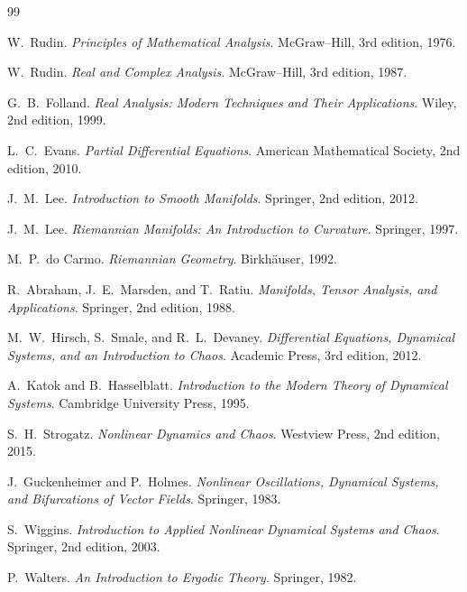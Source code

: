 \documentclass[12pt]{book}
\begin{document}
\newpage
\begin{thebibliography}{99}


W.~Rudin.
\textit{Principles of Mathematical Analysis}.
McGraw--Hill, 3rd edition, 1976.

W.~Rudin.
\textit{Real and Complex Analysis}.
McGraw--Hill, 3rd edition, 1987.

G.~B.~Folland.
\textit{Real Analysis: Modern Techniques and Their Applications}.
Wiley, 2nd edition, 1999.

L.~C.~Evans.
\textit{Partial Differential Equations}.
American Mathematical Society, 2nd edition, 2010.


J.~M.~Lee.
\textit{Introduction to Smooth Manifolds}.
Springer, 2nd edition, 2012.

J.~M.~Lee.
\textit{Riemannian Manifolds: An Introduction to Curvature}.
Springer, 1997.

M.~P.~do Carmo.
\textit{Riemannian Geometry}.
Birkhäuser, 1992.

R.~Abraham, J.~E.~Marsden, and T.~Ratiu.
\textit{Manifolds, Tensor Analysis, and Applications}.
Springer, 2nd edition, 1988.


M.~W.~Hirsch, S.~Smale, and R.~L.~Devaney.
\textit{Differential Equations, Dynamical Systems, and an Introduction to Chaos}.
Academic Press, 3rd edition, 2012.

A.~Katok and B.~Hasselblatt.
\textit{Introduction to the Modern Theory of Dynamical Systems}.
Cambridge University Press, 1995.

S.~H.~Strogatz.
\textit{Nonlinear Dynamics and Chaos}.
Westview Press, 2nd edition, 2015.

J.~Guckenheimer and P.~Holmes.
\textit{Nonlinear Oscillations, Dynamical Systems, and Bifurcations of Vector Fields}.
Springer, 1983.

S.~Wiggins.
\textit{Introduction to Applied Nonlinear Dynamical Systems and Chaos}.
Springer, 2nd edition, 2003.


P.~Walters.
\textit{An Introduction to Ergodic Theory}.
Springer, 1982.


\end{thebibliography}
\end{document}
